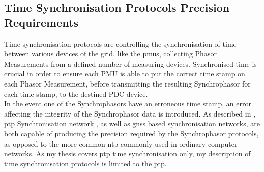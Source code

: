 \subsection{Time Synchronisation Protocols Precision Requirements}
Time synchronisation protocols are controlling the synchronisation of time between various devices of the grid, like the \acrshort{pmu}s, collecting Phasor Measurements from a defined number of measuring devices. Synchronised time is crucial in order to ensure each PMU is able to put the correct time stamp on each Phasor Measurement, before transmitting the resulting Synchrophasor for each time stamp, to the destined PDC device.\\ 

In the event one of the Synchrophasors have an erroneous time stamp, an error affecting the integrity of the Synchrophasor data is introduced. As described in \cite{moussa2016security}, \acrlong{ptp} Synchronisation network
, as well as \acrlong{gnss} based synchronisation networks, are both capable of producing the precision required by the Synchrophasor protocols, as opposed to the more common \acrfull{ntp} commonly used in ordinary computer networks. As my thesis covers \acrshort{ptp} time synchronisation only, my description of time synchronisation protocols is limited to the \acrfull{ptp}.























